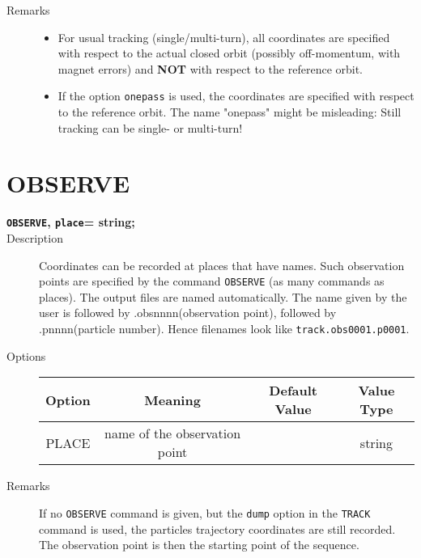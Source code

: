 \begin{description}
	\item[Remarks] 
          \begin{itemize}
	  \item 
            For usual tracking (single/multi-turn), all coordinates are specified with respect to the actual closed 
            orbit (possibly off-momentum, with magnet errors) and \textbf{NOT} with respect 
            to the reference orbit.
	  \item 
            
            If the option \texttt{onepass} is used, the coordinates are specified with respect 
            to the reference orbit. The name "onepass" might be misleading: Still tracking can be single- or multi-turn!  
            
          \end{itemize}
          
\end{description}

\section{OBSERVE}
\begin{description}
   \item[\textbf{\texttt{OBSERVE}, \texttt{place}= string;}] 
     
   \item[Description] 
     Coordinates can be recorded at places that have names.  Such observation points are 
     specified by the command \texttt{OBSERVE} (as many commands as places).
     The output files are named automatically. The name given by the user is followed 
     by .obsnnnn(observation point), followed by .pnnnn(particle number). Hence filenames look like \texttt{track.obs0001.p0001}. 
     
   \item[Options] 
     \text{ \\}	
     
     \begin{tabular}{cccc}
       \hline 
       \textbf{Option} & \textbf{Meaning} & \textbf{Default Value} & \textbf{Value Type} \\ 
       \hline
       PLACE & name of the observation point &  & string \\ 
       \hline
       
     \end{tabular}
   \item[Remarks] 
     If no \texttt{OBSERVE} command is given, but the \texttt{dump} option in the 
     \texttt{TRACK} command is used, the particles trajectory coordinates are still recorded. 
     The observation point is then the starting point of the sequence.
     
\end{description}

